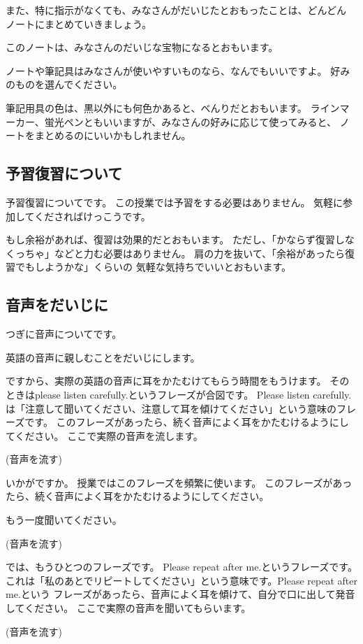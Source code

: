 \documentclass[12pt]{jlreq}
\begin{document}
また、特に指示がなくても、みなさんがだいじたとおもったことは、どんどん
ノートにまとめていきましょう。

このノートは、みなさんのだいじな宝物になるとおもいます。

ノートや筆記具はみなさんが使いやすいものなら、なんでもいいですよ。
好みのものを選んでください。

筆記用具の色は、黒以外にも何色かあると、べんりだとおもいます。
ラインマーカー、蛍光ペンともいいますが、みなさんの好みに応じて使ってみると、
ノートをまとめるのにいいかもしれません。

\subsection{予習復習について}

予習復習についてです。
この授業では予習をする必要はありません。
気軽に参加してくださればけっこうです。

もし余裕があれば、復習は効果的だとおもいます。
ただし、「かならず復習しなくっちゃ」などと力む必要はありません。
肩の力を抜いて、「余裕があったら復習でもしようかな」くらいの
気軽な気持ちでいいとおもいます。


\subsection{音声をだいじに}
つぎに音声についてです。

英語の音声に親しむことをだいじにします。

ですから、実際の英語の音声に耳をかたむけてもらう時間をもうけます。
そのときはplease listen carefully.というフレーズが合図です。
Please listen carefully.は「注意して聞いてください、注意して耳を傾けてください」という意味のフレーズです。
このフレーズがあったら、続く音声によく耳をかたむけるようにしてください。
ここで実際の音声を流します。

(音声を流す)

いかがですか。
授業ではこのフレーズを頻繁に使います。
このフレーズがあったら、続く音声によく耳をかたむけるようにしてください。

もう一度聞いてください。

(音声を流す)

では、もうひとつのフレーズです。
Please repeat after me.というフレーズです。
これは「私のあとでリピートしてください」という意味です。Please repeat after me.という
フレーズがあったら、音声によく耳を傾けて、自分で口に出して発音してください。
ここで実際の音声を聞いてもらいます。

(音声を流す)
\end{document}
